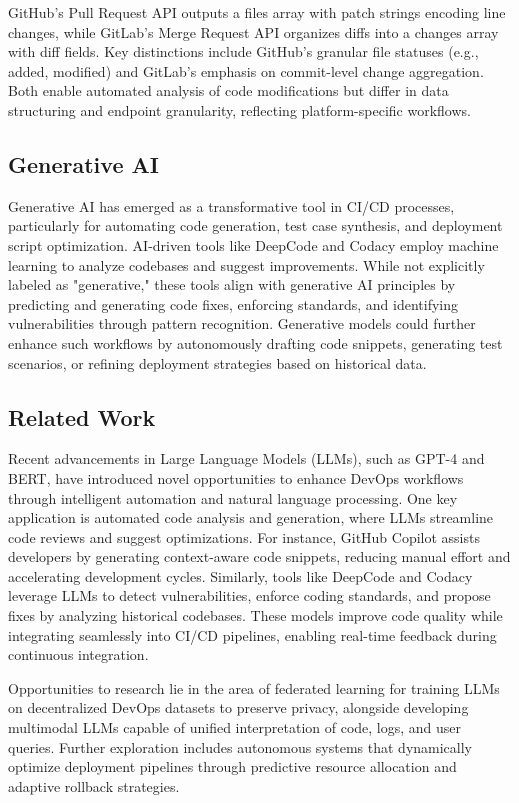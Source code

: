 \documentclass[12pt]{article}
\begin{document}
GitHub’s Pull Request API outputs a files array with patch strings encoding line changes, while GitLab’s Merge Request API organizes diffs into a changes array with diff fields. Key distinctions include GitHub’s granular file statuses (e.g., added, modified) and GitLab’s emphasis on commit-level change aggregation. Both enable automated analysis of code modifications but differ in data structuring and endpoint granularity, reflecting platform-specific workflows.

\subsection{Generative AI}
Generative AI has emerged as a transformative tool in CI/CD processes, particularly for automating code generation, test case synthesis, and deployment script optimization. AI-driven tools like DeepCode and Codacy employ machine learning to analyze codebases and suggest improvements. While not explicitly labeled as "generative," these tools align with generative AI principles by predicting and generating code fixes, enforcing standards, and identifying vulnerabilities through pattern recognition. Generative models could further enhance such workflows by autonomously drafting code snippets, generating test scenarios, or refining deployment strategies based on historical data. \cite{AIDrivenDevops}

\subsection{Related Work}
Recent advancements in Large Language Models (LLMs), such as GPT-4 and BERT, have introduced novel opportunities to enhance DevOps workflows through intelligent automation and natural language processing. One key application is automated code analysis and generation, where LLMs streamline code reviews and suggest optimizations. For instance, GitHub Copilot assists developers by generating context-aware code snippets, reducing manual effort and accelerating development cycles. Similarly, tools like DeepCode and Codacy leverage LLMs to detect vulnerabilities, enforce coding standards, and propose fixes by analyzing historical codebases. These models improve code quality while integrating seamlessly into CI/CD pipelines, enabling real-time feedback during continuous integration. \cite{aiStreamlinedCICD}

Opportunities to research lie in the area of federated learning for training LLMs on decentralized DevOps datasets to preserve privacy, alongside developing multimodal LLMs capable of unified interpretation of code, logs, and user queries. Further exploration includes autonomous systems that dynamically optimize deployment pipelines through predictive resource allocation and adaptive rollback strategies. \cite{aiStreamlinedCICD}
\end{document}
